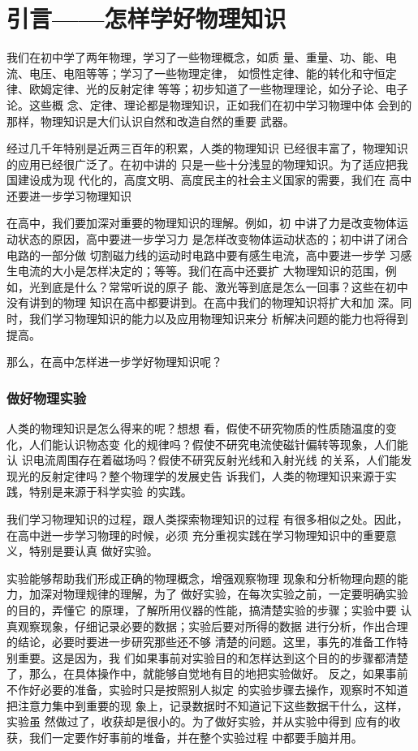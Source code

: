 \chapter{引言——怎样学好物理知识}

我们在初中学了两年物理，学习了一些物理概念，如质
量、重量、功、能、电流、电压、电阻等等；学习了一些物理定律，
如惯性定律、能的转化和守恒定律、欧姆定律、光的反射定律
等等；初步知道了一些物理理论，如分子论、电子论。这些概
念、定律、理论都是物理知识，正如我们在初中学习物理中体
会到的那样，物理知识是大们认识自然和改造自然的重要
武器。

经过几千年特别是近两三百年的积累，人类的物理知识
已经很丰富了，物理知识的应用已经很广泛了。在初中讲的
只是一些十分浅显的物理知识。为了适应把我国建设成为现
代化的，高度文明、高度民主的社会主义国家的需要，我们在
高中还要进一步学习物理知识

    在高中，我们要加深对重要的物理知识的理解。例如，初
中讲了力是改变物体运动状态的原因，高中要进一步学习力
是怎样改变物体运动状态的；初中讲了闭合电路的一部分做
切割磁力线的运动时电路中要有感生电流，高中要进一步学
习感生电流的大小是怎样决定的；等等。我们在高中还要扩
大物理知识的范围，例如，光到底是什么？常常听说的原子
能、激光等到底是怎么一回事？这些在初中没有讲到的物理
知识在高中都要讲到。在高中我们的物理知识将扩大和加
深。同时，我们学习物理知识的能力以及应用物理知识来分
析解决问题的能力也将得到提高。

    那么，在高中怎样进一步学好物理知识呢？

\subsection*{做好物理实验}
人类的物理知识是怎么得来的呢？想想
看，假使不研究物质的性质随温度的变化，人们能认识物态变
化的规律吗？假使不研究电流使磁针偏转等现象，人们能认
识电流周围存在着磁场吗？假使不研究反射光线和入射光线
的关系，人们能发现光的反射定律吗？整个物理学的发展史告
诉我们，人类的物理知识来源于实践，特别是来源于科学实验
的实践。

    我们学习物理知识的过程，跟人类探索物理知识的过程
有很多相似之处。因此，在高中迸一步学习物理的时候，必须
充分重视实践在学习物理知识中的重要意义，特别是要认真
做好实验。

    实验能够帮助我们形成正确的物理概念，增强观察物理
现象和分析物理向题的能力，加深对物理规律的理解，为了
做好实验，在每次实验之前，一定要明确实验的目的，弄懂它
的原理，了解所用仪器的性能，搞清楚实验的步骤；实验中要
认真观察现象，仔细记录必要的数据；实验后要对所得的数据
进行分析，作出合理的结论，必要时要进一步研究那些还不够
清楚的问题。这里，事先的准备工作特别重要。这是因为，我
们如果事前对实验目的和怎样达到这个目的的步骤都清楚
了，那么，在具体操作中，就能够自觉地有目的地把实验做好。
反之，如果事前不作好必要的准备，实验时只是按照别人拟定
的实验步骤去操作，观察时不知道把注意力集中到重要的现
象上，记录数据时不知道记下这些数据干什么，这样，实验虽
然做过了，收获却是很小的。为了做好实验，并从实验中得到
应有的收获，我们一定要作好事前的堆备，并在整个实验过程
中都要手脑并用。

